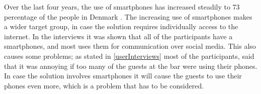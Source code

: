 Over the last four years, the use of smartphones has increased steadily to 73 percentage of the people in Denmark \cite{smartphone2014}. The increasing use of smartphones makes a wider target group, in case the solution requires individually access to the internet. In the interviews it was shown that all of the participants have a smartphones, and most uses them for communication over social media. This also causes some problems; as stated in \cref{userInterviews} most of the participants, said that it was annoying if too many of the guests at the bar were using their phones. In case the solution involves smartphones it will cause the guests to use their phones even more, which is a problem that has to be considered.

